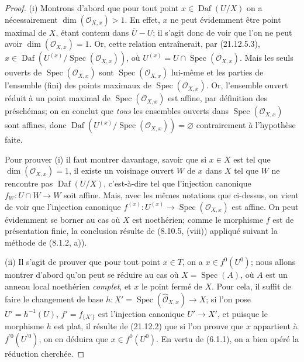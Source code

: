 \begin{proof}
(i) Montrons d'abord que pour tout point $x\in\operatorname{Daf}(U/X)$ on a
nécessairement $\dim(\mathcal O_{X,x})>1$. En effet, $x$ ne peut évidemment être point
maximal de $X$, étant contenu dans $\overline U-U$; il s'agit donc de voir que l'on ne
peut avoir $\dim(\mathcal O_{X,x})=1$. Or, cette relation entraînerait, par (21.12.5.3),
$x\in\operatorname{Daf}(U^{(x)}/\operatorname{Spec}(\mathcal O_{X,x}))$, où
$U^{(x)}=U\cap\operatorname{Spec}(\mathcal O_{X,x})$. Mais les seuls ouverts de
$\operatorname{Spec}(\mathcal O_{X,x})$ sont $\operatorname{Spec}(\mathcal O_{X,x})$
lui-même et les parties de l'ensemble (fini) des points maximaux de
$\operatorname{Spec}(\mathcal O_{X,x})$. Or, l'ensemble ouvert réduit à un point maximal
de $\operatorname{Spec}(\mathcal O_{X,x})$ est affine, par définition des préschémas; on
en conclut que \emph{tous} les ensembles ouverts dans
$\operatorname{Spec}(\mathcal O_{X,x})$ sont affines, donc
$\operatorname{Daf}(U^{(x)}/\operatorname{Spec}(\mathcal O_{X,x}))=\varnothing$
contrairement à l'hypothèse faite.

Pour prouver (i) il faut montrer davantage, savoir que si $x\in X$ est tel que
$\dim(\mathcal O_{X,x})=1$, il existe un voisinage ouvert $W$ de $x$ dans $X$ tel que
$W$ ne rencontre pas $\operatorname{Daf}(U/X)$, c'est-à-dire tel que l'injection
canonique $f_W:U\cap W\to W$ soit affine. Mais, avec les mêmes notations que ci-dessus,
on vient de voir que l'injection canonique
$f^{(x)}:U^{(x)}\to\operatorname{Spec}(\mathcal O_{X,x})$ est affine. On peut
évidemment se borner au cas où $X$ est noethérien; comme le morphisme $f$ est de
présentation finie, la conclusion résulte de (8.10.5, (viii)) appliqué suivant la
méthode de (8.1.2, a)).

(ii) Il s'agit de prouver que pour tout point $x\in T$, on a $x\in f^0(U^0)$; nous
allons montrer d'abord qu'on peut se réduire au cas où $X=\operatorname{Spec}(A)$, où
$A$ est un anneau local noethérien \emph{complet}, et $x$ le point fermé de $X$. Pour
cela, il suffit de faire le changement de base
$h:X'=\operatorname{Spec}(\widehat{\mathcal O}_{X,x})\to X$; si l'on pose
$U'=h^{-1}(U)$, $f'=f_{\{X'\}}$ est l'injection canonique $U'\to X'$, et puisque le
morphisme $h$ est plat, il résulte de (21.12.2) que si l'on prouve que $x$ appartient à
$f^{\prime 0}(U^{\prime 0})$, on en déduira que $x\in f^0(U^0)$. En vertu de (6.1.1), on a
bien opéré la réduction cherchée.


\end{proof}
